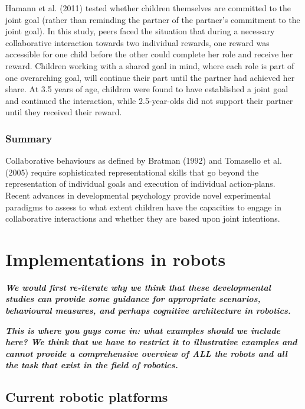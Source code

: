 \documentclass{article}
\begin{document}
Hamann et al. (2011) tested whether children themselves are committed to
the joint goal (rather than reminding the partner of the partner's commitment
to the joint goal). In this study, peers faced the situation that during a
necessary collaborative interaction towards two individual rewards, one reward
was accessible for one child before the other could complete her role and
receive her reward. Children working with a shared goal in mind, where each
role is part of one overarching goal, will continue their part until the
partner had achieved her share. At 3.5 years of age, children were found to
have established a joint goal and continued the interaction, while
2.5-year-olds did not support their partner until they received their reward.

\subsubsection{Summary}

Collaborative behaviours as defined by Bratman (1992) and Tomasello et al.
(2005) require sophisticated representational skills that go beyond the
representation of individual goals and execution of individual action-plans.
Recent advances in developmental psychology provide novel experimental
paradigms to assess to what extent children have the capacities to engage in
collaborative interactions and whether they are based upon joint intentions. 

\section{Implementations in robots}

{\bfseries\itshape We would first re-iterate why we think that these
developmental studies can provide some guidance for appropriate scenarios,
behavioural measures, and perhaps cognitive architecture in robotics.}

{\bfseries\itshape This is where you guys come in: what examples should we
include here? We think that we have to restrict it to illustrative examples and
cannot provide a comprehensive overview of ALL the robots and all the task that
exist in the field of robotics.}

\subsection{Current robotic platforms}
\end{document}

